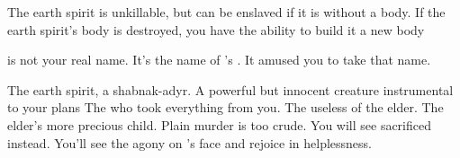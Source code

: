 \documentclass[char]{guildcamp4}
\begin{document}
\begin{itemz}[Notes]
	\item The earth spirit is unkillable, but can be enslaved if it is without a body. If the earth spirit's body is destroyed, you have the ability to build it a new body
	\item \cShaman{} is not your real name. It's the name of \cElder{\intro}'s \cElderSpouse{\spouse}. It amused you to take that name. 
\end{itemz}

\begin{contacts}
	\contact{\cPlaguebearer{}} The earth spirit, a shabnak-adyr. A powerful but innocent creature instrumental to your plans
	\contact{\cElder{}} The \cElder{\human} who took everything from you. 
	\contact{\cApprentice{}} The useless \cApprentice{\offspring} of the elder.
	\contact{\cRebel{}} The elder's more precious child. Plain murder is too crude. You will see \cRebel{\them} sacrificed instead. You'll see the agony on \cElder{}'s face and rejoice in \cElder{\their} helplessness.
\end{contacts}
\end{document}
